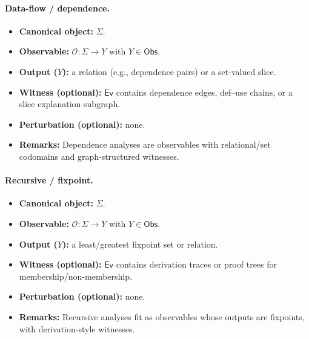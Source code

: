 \documentclass[11pt]{article}
\begin{document}
\paragraph{Data-flow / dependence.}
\begin{itemize}[leftmargin=*]
  \item \textbf{Canonical object:} $\Sigma$.
  \item \textbf{Observable:} $\mathcal O: \Sigma\to Y$ with $Y\in\mathsf{Obs}$.
  \item \textbf{Output ($Y$):} a relation (e.g., dependence pairs) or a set-valued slice.
  \item \textbf{Witness (optional):} $\mathsf{Ev}$ contains dependence edges, def--use chains, or a slice explanation subgraph.
  \item \textbf{Perturbation (optional):} none.
  \item \textbf{Remarks:} Dependence analyses are observables with relational/set codomains and graph-structured witnesses.
\end{itemize}

\paragraph{Recursive / fixpoint.}
\begin{itemize}[leftmargin=*]
  \item \textbf{Canonical object:} $\Sigma$.
  \item \textbf{Observable:} $\mathcal O: \Sigma\to Y$ with $Y\in\mathsf{Obs}$.
  \item \textbf{Output ($Y$):} a least/greatest fixpoint set or relation.
  \item \textbf{Witness (optional):} $\mathsf{Ev}$ contains derivation traces or proof trees for membership/non-membership.
  \item \textbf{Perturbation (optional):} none.
  \item \textbf{Remarks:} Recursive analyses fit as observables whose outputs are fixpoints, with derivation-style witnesses.
\end{itemize}
\end{document}
